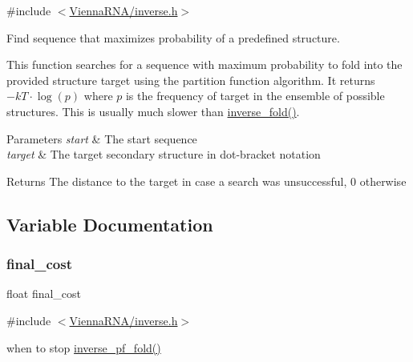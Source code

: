{\ttfamily \#include $<$\hyperlink{inverse_8h}{Vienna\+R\+N\+A/inverse.\+h}$>$}



Find sequence that maximizes probability of a predefined structure. 

This function searches for a sequence with maximum probability to fold into the provided structure \textquotesingle{}target\textquotesingle{} using the partition function algorithm. It returns $-kT \cdot \log(p)$ where $p$ is the frequency of \textquotesingle{}target\textquotesingle{} in the ensemble of possible structures. This is usually much slower than \hyperlink{group__inverse__fold_ga7af026de55d4babad879f2c92559cbbc}{inverse\+\_\+fold()}.


\begin{DoxyParams}{Parameters}
{\em start} & The start sequence \\
\hline
{\em target} & The target secondary structure in dot-\/bracket notation \\
\hline
\end{DoxyParams}
\begin{DoxyReturn}{Returns}
The distance to the target in case a search was unsuccessful, 0 otherwise 
\end{DoxyReturn}


\subsection{Variable Documentation}
\mbox{\label{group__inverse__fold_ga7f17d3b169af048d32bb185039a9c09c}} 
\subsubsection{\texorpdfstring{final\+\_\+cost}{final\_cost}}
{\footnotesize\ttfamily float final\+\_\+cost}



{\ttfamily \#include $<$\hyperlink{inverse_8h}{Vienna\+R\+N\+A/inverse.\+h}$>$}

when to stop \hyperlink{group__inverse__fold_gaeef52ecbf2a2450ad585a344f9826806}{inverse\+\_\+pf\+\_\+fold()} \mbox{\label{group__inverse__fold_ga7ec4ba51f86e1717a1e174264e4a75ce}} 
